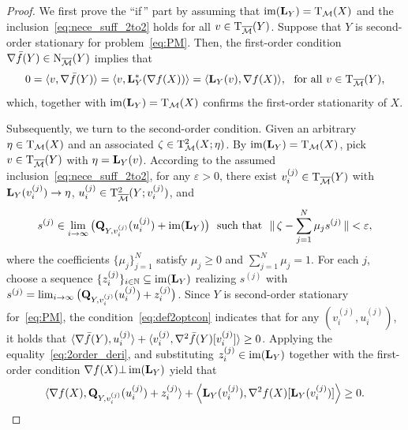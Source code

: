 \begin{proof}
    We first prove the ``if\,'' part by assuming that $\operatorname{im}(\mathrm{\bf L}_Y)=\mathrm{T}_{\mathcal{M}}(X)$ and the inclusion~\eqref{eq:nece_suff_2to2} holds for all $v\in\mathrm{T}_{\overline{\mathcal{M}}}(Y)$. Suppose that $Y$ is second-order stationary for problem~\eqref{eq:PM}. Then, the first-order condition $\nabla \bar{f}(Y)\in\mathrm{N}_{\overline{\mathcal{M}}}(Y)$ implies that
    \begin{equation*}
        0=\innerp{v,\nabla\bar{f}(Y)}=\innerp{v,\tanL_Y^*(\nabla f(X))}=\innerp{\tanL_Y(v),\nabla f(X)},\ \ \text{for all}\ v\in\Btangent_{\bmanifold}(Y),
    \end{equation*}
    which, together with $\operatorname{im}(\mathrm{\bf L}_Y)=\mathrm{T}_{\mathcal{M}}(X)$ confirms the first-order stationarity of $X$.

    Subsequently, we turn to the second-order condition. Given an arbitrary $\eta\in \mathrm{T}_{\mathcal{M}}(X)$ and an associated $\zeta\in \mathrm{T}^2_{\mathcal{M}}(X;\eta)$. By $\operatorname{im}(\mathrm{\bf L}_Y)=\mathrm{T}_{\mathcal{M}}(X)$, pick $v\in \mathrm{T}_{\overline{\mathcal{M}}}(Y)$ with $\eta=\mathrm{\bf L}_Y(v)$. According to the assumed inclusion~\eqref{eq:nece_suff_2to2}, for any $\varepsilon>0$, there exist $v_i^{(j)}\in \mathrm{T}_{\overline{\mathcal{M}}}(Y)$ with $\mathrm{\bf L}_Y(v_i^{(j)})\to \eta$, $u_i^{(j)}\in\mathrm{T}^2_{\overline{\mathcal{M}}}(Y;v_{i}^{(j)})$, and
    \begin{equation}\label{eq:varepsilon_sj}
        s^{(j)}\in \lim_{i\to\infty}\big(\tanQ_{Y,v_i^{(j)}}(u_i^{(j)})+\ima(\tanL_Y)\big)\ \ \text{such that}\ \ \|\,\zeta - \sum_{j=1}^N \mu_j s^{(j)}\,\|<\varepsilon,
    \end{equation}
    where the coefficients $\{\mu_j\}_{j=1}^N$ satisfy $\mu_j\ge0$ and $\sum_{j=1}^N\mu_j=1$. For each $j$, choose a sequence $\{z_i^{(j)}\}_{i\in\mathbb{N}}\subseteq \operatorname{im}(\mathrm{\bf L}_Y)$ realizing $s^{(j)}$ with $s^{(j)}=\lim_{i\to\infty}\big(\mathrm{\bf Q}_{Y,v_i^{(j)}}(u_i^{(j)})+z_i^{(j)}\big)$. Since $Y$ is second-order stationary for~\eqref{eq:PM}, the condition~\eqref{eq:def2optcon} indicates that for any $(v_i^{(j)},u_i^{(j)})$, it holds that $\langle {\nabla \bar{f}(Y),u_{i}^{(j)}} \rangle+\langle {v_{i}^{(j)},\nabla^2 \bar{f}(Y)[v_{i}^{(j)}]} \rangle \ge 0$. Applying the equality~\eqref{eq:2order_deri}, and substituting $z^{(j)}_i\in\operatorname{im}(\mathrm{\bf L}_Y)$ together with the first-order condition $\nabla f(X)\bot\operatorname{im}(\mathrm{\bf L}_Y)$ yield that
    \begin{equation*}
        \langle {\nabla f(X),\mathrm{\bf Q}_{Y,v_{i}^{(j)}}(u_{i}^{(j)})+z^{(j)}_i} \rangle  + \left\langle\mathrm{\bf L}_Y(v_{i}^{(j)}),\nabla^2 f(X)[\mathrm{\bf L}_Y(v_{i}^{(j)})]\right \rangle \ge 0.
    \end{equation*}

\end{proof}
